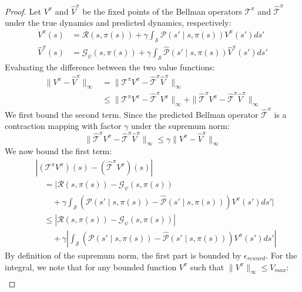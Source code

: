 \documentclass[manuscript, screen, review]{jair}
\begin{document}
\begin{proof}
Let $V^\pi$ and $\hat{V}^\pi$ be the fixed points of the Bellman operators $\mathcal{T}^\pi$ and $\hat{\mathcal{T}}^\pi$ under the true dynamics and predicted dynamics, respectively:
\begin{align*}
    V^\pi(s) &= \mathcal{R}(s, \pi(s)) + \gamma \int_{\mathcal{S}} \mathcal{P}(s' \mid s, \pi(s)) V^\pi(s') ds' \\
    \hat{V}^\pi(s) &= \mathcal{G}_\psi(s, \pi(s)) + \gamma \int_{\mathcal{S}} \hat{\mathcal{P}}(s' \mid s, \pi(s)) \hat{V}^\pi(s') ds'
\end{align*}
Evaluating the difference between the two value functions:
\begin{align*}
    \| V^\pi - \hat{V}^\pi \|_\infty &= \| \mathcal{T}^\pi V^\pi - \hat{\mathcal{T}}^\pi \hat{V}^\pi \|_\infty \\
    &\le \| \mathcal{T}^\pi V^\pi - \hat{\mathcal{T}}^\pi V^\pi \|_\infty + \| \hat{\mathcal{T}}^\pi V^\pi - \hat{\mathcal{T}}^\pi \hat{V}^\pi \|_\infty
\end{align*}
We first bound the second term. Since the predicted Bellman operator $\hat{\mathcal{T}}^\pi$ is a contraction mapping with factor $\gamma$ under the supremum norm:
\begin{equation*}
    \| \hat{\mathcal{T}}^\pi V^\pi - \hat{\mathcal{T}}^\pi \hat{V}^\pi \|_\infty \le \gamma \| V^\pi - \hat{V}^\pi \|_\infty
\end{equation*}
We now bound the first term:
\begin{align*}
    &\left| \left( \mathcal{T}^\pi V^\pi \right)(s) - \left( \hat{\mathcal{T}}^\pi V^\pi \right)(s) \right| \\
    &\quad = \Big| \mathcal{R}(s, \pi(s)) - \mathcal{G}_\psi(s, \pi(s)) \\
    &\quad\quad + \gamma \int_{\mathcal{S}} \left( \mathcal{P}(s' \mid s, \pi(s)) - \hat{\mathcal{P}}(s' \mid s, \pi(s)) \right) V^\pi(s') ds' \Big| \\
    &\quad \le \left| \mathcal{R}(s, \pi(s)) - \mathcal{G}_\psi(s, \pi(s)) \right| \\
    &\quad\quad + \gamma \left| \int_{\mathcal{S}} \left( \mathcal{P}(s' \mid s, \pi(s)) - \hat{\mathcal{P}}(s' \mid s, \pi(s)) \right) V^\pi(s') ds' \right|
\end{align*}
By definition of the supremum norm, the first part is bounded by $\epsilon_{reward}$. For the integral, we note that for any bounded function $V^\pi$ such that $\|V^\pi\|_\infty \le V_{max}$:
\begin{align*}

\end{align*}
\end{proof}
\end{document}
